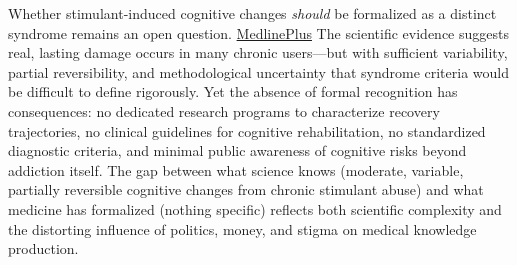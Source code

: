 Whether stimulant-induced cognitive changes \emph{should} be formalized as a distinct syndrome remains an open question. \href{https://medlineplus.gov/genetics/understanding/mutationsanddisorders/naming/}{MedlinePlus} The scientific evidence suggests real, lasting damage occurs in many chronic users---but with sufficient variability, partial reversibility, and methodological uncertainty that syndrome criteria would be difficult to define rigorously. Yet the absence of formal recognition has consequences: no dedicated research programs to characterize recovery trajectories, no clinical guidelines for cognitive rehabilitation, no standardized diagnostic criteria, and minimal public awareness of cognitive risks beyond addiction itself. The gap between what science knows (moderate, variable, partially reversible cognitive changes from chronic stimulant abuse) and what medicine has formalized (nothing specific) reflects both scientific complexity and the distorting influence of politics, money, and stigma on medical knowledge production.
